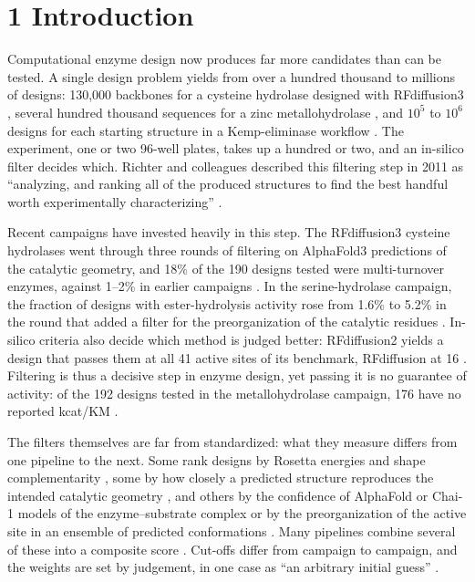 \documentclass[
  10pt,
]{article}
\DeclareRobustCommand{\_}{\textunderscore\hspace{0pt}}
\begin{document}
\section{1
Introduction}

Computational enzyme
design
\cite{listov2026}
now produces far
more candidates than
can be tested. A
single design
problem yields from
over a hundred
thousand to millions
of designs: 130,000
backbones for a
cysteine hydrolase
designed with
RFdiffusion3
\cite{butcher2025},
several hundred
thousand sequences
for a zinc
metallohydrolase
\cite{kim2026}, and
\(10^5\) to \(10^6\)
designs for each
starting structure
in a Kemp-eliminase
workflow
\cite{listov2025}.
The experiment, one
or two 96-well
plates, takes up a
hundred or two, and
an in-silico filter
decides which.
Richter and
colleagues described
this filtering step
in 2011 as
``analyzing, and
ranking all of the
produced structures
to find the best
handful worth
experimentally
characterizing''
\cite{richter2011}.

Recent campaigns
have invested
heavily in this
step. The
RFdiffusion3
cysteine hydrolases
went through three
rounds of filtering
on AlphaFold3
\cite{abramson2024}
predictions of the
catalytic geometry,
and 18\% of the 190
designs tested were
multi-turnover
enzymes, against
1--2\% in earlier
campaigns
\cite{butcher2025}.
In the
serine-hydrolase
campaign, the
fraction of designs
with
ester-hydrolysis
activity rose from
1.6\% to 5.2\% in
the round that added
a filter for the
preorganization of
the catalytic
residues
\cite{lauko2025}.
In-silico criteria
also decide which
method is judged
better: RFdiffusion2
yields a design that
passes them at all
41 active sites of
its benchmark,
RFdiffusion at 16
\cite{ahern2026,watson2023}.
Filtering is thus a
decisive step in
enzyme design, yet
passing it is no
guarantee of
activity: of the 192
designs tested in
the metallohydrolase
campaign, 176 have
no reported kcat/KM
\cite{kim2026}.

The filters
themselves are far
from standardized:
what they measure
differs from one
pipeline to the
next. Some rank
designs by Rosetta
energies and shape
complementarity
\cite{kim2026,listov2025,yeh2023},
some by how closely
a predicted
structure reproduces
the intended
catalytic geometry
\cite{butcher2025,braun2026},
and others by the
confidence of
AlphaFold or Chai-1
models of the
enzyme--substrate
complex
\cite{abramson2024,jumper2021,chai2024}
or by the
preorganization of
the active site in
an ensemble of
predicted
conformations
\cite{lauko2025,anishchenko2025}.
Many pipelines
combine several of
these into a
composite score
\cite{butcher2025,kim2026,listov2025}.
Cut-offs differ from
campaign to
campaign, and the
weights are set by
judgement, in one
case as ``an
arbitrary initial
guess''
\cite{kim2026}.
\end{document}
